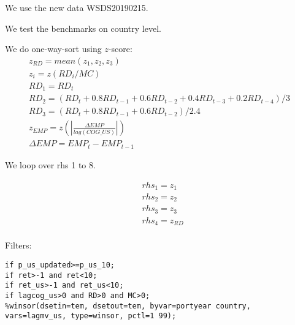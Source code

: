 

\usepackage[T1]{fontenc}




\thispagestyle{fancy}

\newcommand{\code}{\texttt}
\newcommand*{\Commonpath}{20190228/benchmark}


We use the new data WSDS20190215. 

We test the benchmarks on country level.


We do one-way-sort using $z$-score:
$$
\begin{aligned}
& z_{RD} = mean(z_1, z_2, z_3) \\
& z_i = z(RD_i/MC) \\
& RD_1 = RD_t \\
& RD_2 = (RD_t + 0.8RD_{t-1} + 0.6RD_{t-2} + 0.4RD_{t-3} + 0.2RD_{t-4})/3 \\
& RD_3 = (RD_t + 0.8RD_{t-1} + 0.6RD_{t-2})/2.4 
& \\
& z_{EMP} = z(|\frac{\Delta EMP}{lag(COG\_US)}|) \\
& \Delta EMP = EMP_t - EMP_{t-1}
\end{aligned}
$$


We loop over rhs 1 to 8.

$$
\begin{aligned}
& rhs_1 = z_1 \\
& rhs_2 = z_2 \\
& rhs_3 = z_3 \\
& rhs_4 = z_{RD} \\
\end{aligned}
$$ 


Filters:

\code{if p\_us\_updated>=p\_us\_10;} \\
\code{if ret>-1 and ret<10;} \\
\code{if ret\_us>-1 and ret\_us<10;} \\
\code{if lagcog\_us>0 and RD>0 and MC>0;} \\
\code{\%winsor(dsetin=tem, dsetout=tem, byvar=portyear country, vars=lagmv\_us, type=winsor, pctl=1 99);}

\small





